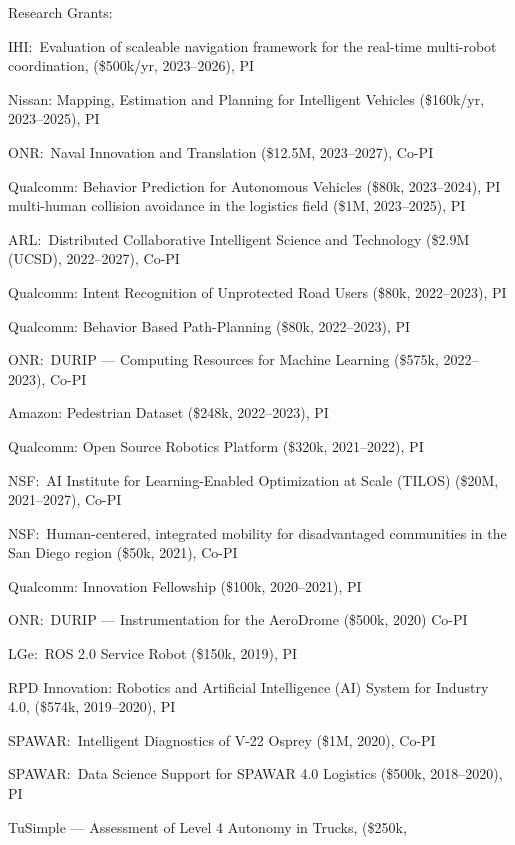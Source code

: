 \documentclass{article}
\begin{document}
\begin{cv}
	\begin{cvlist}{Research Grants:}
		\item IHI:\ Evaluation of scaleable navigation framework for the real-time
		multi-robot coordination, (\$500k/yr, 2023--2026), PI
		\item Nissan: Mapping, Estimation and Planning for Intelligent Vehicles
		(\$160k/yr, 2023--2025), PI
		\item ONR:\ Naval Innovation and Translation (\$12.5M, 2023--2027), Co-PI
		\item Qualcomm: Behavior Prediction for Autonomous Vehicles (\$80k, 2023--2024), PI
		multi-human collision avoidance in the logistics field (\$1M, 2023--2025), PI
		\item ARL:\ Distributed Collaborative Intelligent Science and Technology (\$2.9M
		(UCSD), 2022--2027), Co-PI
		\item Qualcomm: Intent Recognition of Unprotected Road Users (\$80k, 2022--2023),
		PI
		\item Qualcomm: Behavior Based Path-Planning (\$80k, 2022--2023), PI
		\item ONR:\ DURIP --- Computing Resources for Machine Learning (\$575k, 2022--2023),
		Co-PI
		\item Amazon: Pedestrian Dataset (\$248k, 2022--2023), PI
		\item Qualcomm: Open Source Robotics Platform (\$320k, 2021--2022), PI
		\item NSF:\ AI Institute for Learning-Enabled Optimization at Scale
		(TILOS) (\$20M, 2021--2027), Co-PI
		\item NSF:\ Human-centered, integrated mobility for disadvantaged
		communities in the San Diego region (\$50k, 2021), Co-PI
		\item Qualcomm: Innovation Fellowship (\$100k, 2020--2021), PI
		\item ONR:\ DURIP --- Instrumentation for the AeroDrome (\$500k, 2020) Co-PI
		\item LGe:\ ROS 2.0 Service Robot (\$150k, 2019), PI
		\item RPD Innovation: Robotics and Artificial Intelligence (AI) System for
		Industry 4.0, (\$574k, 2019--2020), PI
		\item SPAWAR:\ Intelligent Diagnostics of V-22 Osprey (\$1M, 2020), Co-PI
		\item SPAWAR:\ Data Science Support for SPAWAR 4.0 Logistics (\$500k,
		2018--2020), PI
		\item TuSimple --- Assessment of Level 4 Autonomy in Trucks,  (\$250k,

\end{cvlist}
\end{cv}
\end{document}

